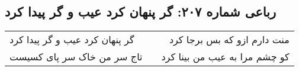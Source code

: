\begin{center}
\section*{رباعی شماره ۲۰۷: گر پنهان کرد عیب و گر پیدا کرد}
\label{sec:sh207}
\begin{longtable}{l p{0.5cm} r}
گر پنهان کرد عیب و گر پیدا کرد
&&
منت دارم ازو که بس برجا کرد
\\
تاج سر من خاک سر پای کسیست
&&
کو چشم مرا به عیب من بینا کرد
\\
\end{longtable}
\end{center}
